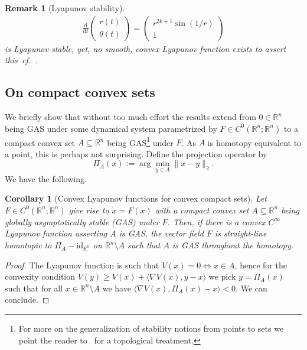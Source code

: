 \documentclass[letterpaper, 10 pt, conference]{ieeeconf}  %
\theoremstyle{mystyle}
\newtheorem{corollary}[theorem]{Corollary}
\newtheorem{remark}[theorem]{Remark}
\begin{document}
{\begin{remark}[Lyapunov stability]
\begin{align*}
    \frac{\mathrm{d}}{\mathrm{d}t}\begin{pmatrix}
        r(t)\\ \theta(t)
    \end{pmatrix} = \begin{pmatrix}
        r^{2k+1}\sin(1/r)\\
        1
    \end{pmatrix}
\end{align*}
is Lyapunov stable, yet, no smooth, convex Lyapunov function exists to assert this~\textit{cf.}~\cite[Thm.~1]{ref:akbarian2023introducing}.
\end{remark}
}

\subsection{On compact convex sets}
We briefly show that without too much effort the results extend from $0\in \mathbb{R}^n$ being GAS under some dynamical system parametrized by $F\in C^{0}(\mathbb{R}^n;\mathbb{R}^n)$ to a compact convex set $A\subseteq \mathbb{R}^n$ being GAS\footnote{For more on the generalization of stability notions from points to sets we point the reader to~\cite{ref:hurley1982attractors} for a topological treatment.} under $F$. As $A$ is homotopy equivalent to a point, this is perhaps not surprising. Define the projection operator by
\begin{equation*}
    \Pi_A(x):=\arg\min_{y\in A}\|x-y\|_2. 
\end{equation*}
We have the following.
\begin{corollary}[Convex Lyapunov functions for convex compact sets]
\label{cor:cvx:Lyap:A}
    Let $F\in C^{0}(\mathbb{R}^n;\mathbb{R}^n)$ give rise to $\dot{x}=F(x)$ with a compact convex set $A\subseteq \mathbb{R}^n$ being globally asymptotically stable (GAS) under $F$. Then, if there is a convex $C^{\infty}$ Lyapunov function asserting $A$ is GAS, the vector field $F$ is straight-line homotopic to $\Pi_A-\mathrm{id}_{\mathbb{R}^n}$ on $\mathbb{R}^n\setminus A$ such that $A$ is GAS throughout the homotopy.
\end{corollary}
\begin{proof}
    The Lyapunov function is such that $V(x)=0\iff x\in A$, hence for the convexity condition $V(y)\geq V(x)+\langle \nabla V(x),y-x \rangle$ we pick $y=\Pi_A(x)$ such that for all $x\in \mathbb{R}^n\setminus A$ we have $\langle \nabla V(x),\Pi_A(x)-x\rangle <0$. We can conclude. 
\end{proof}
\end{document}
